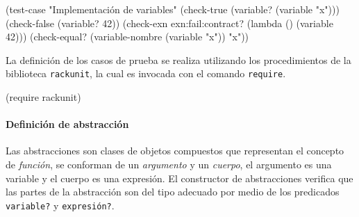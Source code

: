 \documentclass[10pt,oneside,openany,letterpaper]{book}
\begin{document}
\nwenddocs{}\endmoddef
(test-case "Implementación de variables"  
  (check-true (variable? (variable "x")))
  (check-false (variable? 42))
  (check-exn exn:fail:contract? (lambda () (variable 42)))
  (check-equal? (variable-nombre (variable "x")) "x"))
\nwendcode{}\nwdocspar

La definición de los casos de prueba se realiza utilizando los procedimientos de la biblioteca {\tt{}rackunit}, la cual es invocada con el comando {\tt{}require}.

\nwenddocs{}\endmoddef
(require rackunit)
\nwendcode{}\nwdocspar

\paragraph{Definición de abstracción} Las abstracciones son clases de objetos compuestos que representan el concepto de \emph{función}, se conforman de un \emph{argumento} y un \emph{cuerpo}, el argumento es una variable y el cuerpo es una expresión. El constructor de abstracciones verifica que las partes de la abstracción son del tipo adecuado por medio de los predicados {\tt{}\protect{}variable?} y {\tt{}\protect{}expresión?}.
\end{document}
